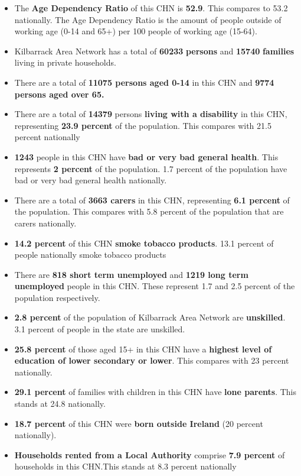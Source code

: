 \documentclass{article}
\begin{document}
\begin{itemize}

\item The \textbf{Age Dependency Ratio} of this CHN is  \textbf{52.9}. This compares to 53.2 nationally. The Age Dependency Ratio is the amount of people outside of working age (0-14 and 65+) per 100 people of working age (15-64). 

\item Kilbarrack Area Network has a total of \textbf{\num{60233}} \textbf{persons} and  \textbf{\num{15740}} \textbf{families} living in private households.

\item There are a total of \textbf{\num{11075} persons aged 0-14} in this CHN and \textbf{\num{9774} persons aged over 65.} 

\item There are a total of \textbf{\num{14379}} persons \textbf{living with a disability} in this CHN, representing \textbf{23.9 percent} of the population. This compares with  21.5 percent nationally

\item \textbf{\num{1243}} people in this CHN have \textbf{bad or very bad general health}. This represents \textbf{2 percent} of the population. 1.7 percent of the population have bad or very bad general health nationally. 

\item There are a total of \textbf{\num{3663} carers} in this CHN, representing \textbf{6.1 percent} of the population. This compares with 5.8 percent of the population that are carers nationally. 

\item \textbf{14.2 percent} of this CHN \textbf{smoke tobacco products}. 13.1 percent of people nationally smoke tobacco products

\item There are \textbf{\num{818} short term unemployed} and \textbf{\num{1219} long term unemployed} people in this CHN. These represent 1.7 and 2.5 percent of the population respectively.

\item  \textbf{2.8 percent} of the population of Kilbarrack Area Network are \textbf{unskilled}. 3.1 percent of people in the state are unskilled.

\item \textbf{25.8 percent} of those aged 15+ in this CHN have a \textbf{highest level of education of lower secondary or lower}. This compares with 23 percent nationally. 

\item \textbf{29.1 percent} of families with children in this CHN have \textbf{lone parents}. This stands at 24.8 nationally.

\item \textbf{18.7 percent} of this CHN were \textbf{born outside Ireland} (20 percent nationally).

\item \textbf{Households rented from a Local Authority} comprise \textbf{7.9 percent} of households in this CHN.This stands at 8.3 percent nationally

\end{itemize}
\end{document}
